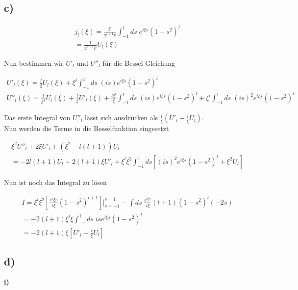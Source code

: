 \subsection{c)}

\begin{align}
j_l \left(\xi\right) = \frac{\xi^l}{2^{l+1}l!} \int_{-1}^1 ds \; e^{i\xi s}
\left(1-s^2\right)^l \\
= \frac{1}{2^{l+1}l!} U_l \left(\xi\right)
\end{align}

Nun bestimmen wir $U'_l$ und $U''_l$ f\"ur die Bessel-Gleichung

\begin{align}
U'_l \left(\xi\right) = \frac{l}{\xi} U_l \left(\xi\right) + \xi^l \int_{-1}^1
ds \; \left(is\right) e^{i\xi s} \left(1-s^2\right)^l \\
U''_l \left(\xi\right) = \frac{l}{\xi^2} U_l \left(\xi\right) + \frac{l}{\xi}
U'_l \left(\xi\right) + \frac{l\xi^l}{\xi} \int_{-1}^1 ds \; \left(is\right)
e^{i\xi s} \left(1-s^2\right)^l + \xi^l \int_{-1}^1 ds \; \left(is\right)^2
e^{i\xi s} \left(1-s^2\right)^l
\end{align}

Das erste Integral von $U''_l$ l\"asst sich ausdr\"ucken als $\frac{l}{\xi}
\left(U'_l - \frac{l}{\xi} U_l \right) $.\\
Nun werden die Terme in die Besselfunktion eingesetzt

\begin{align}
\xi^2 U''_l + 2 \xi U'_l + \left(\xi^2-l \left(l+1\right) \right) U_l \\
= -2l\left(l+1\right) U_l + 2\left(l+1\right) \xi U'_l + \xi^l \xi^2 \int_{-1}^1
ds \left[ \left(is\right)^2
e^{i\xi s} \left(1-s^2\right)^l + \xi^2 U_l \right]
\end{align}

Nun ist noch das Integral zu l\"osen

\begin{align}
I = \xi^l \xi^2 \left[ \frac{e^i\xi s}{i\xi} \left(1-s^2\right)^{l+1} \right]
\bigg|_{s=-1}^{s=1} - \int ds \; \frac{e^{i\xi s}}{i\xi} \left(l+1\right)
\left(1-s^2\right)^l \left(-2s\right) \\
= -2 \left(l+1\right) \xi^l \xi \int_{-1}^{1} ds \; is e^{i\xi s}
\left(1-s^2\right)^l \\
= -2 \left(l+1\right) \xi \left[U'_l -\frac{l}{\xi} U_l \right]
\end{align}

\subsection{d)}

\textbf{i)}

